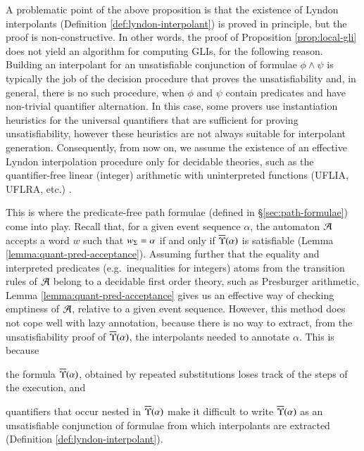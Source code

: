 A problematic point of the above proposition is that the existence of
Lyndon interpolants (Definition \ref{def:lyndon-interpolant}) is
proved in principle, but the proof is non-constructive. In other
words, the proof of Proposition \ref{prop:local-gli} does not yield an
algorithm for computing GLIs, for the following reason. Building an
interpolant for an unsatisfiable conjunction of formulae $\phi \wedge
\psi$ is typically the job of the decision procedure that proves the
unsatisfiability and, in general, there is no such procedure, when
$\phi$ and $\psi$ contain predicates and have non-trivial quantifier
alternation. In this case, some provers use instantiation heuristics
for the universal quantifiers that are sufficient for proving
unsatisfiability, however these heuristics are not always suitable for
interpolant generation. Consequently, from now on, we assume the
existence of an effective Lyndon interpolation procedure only for
decidable theories, such as the quantifier-free linear (integer)
arithmetic with uninterpreted functions (UFLIA, UFLRA, etc.)
\cite{RybalchenkoSofronieStokkermans}.

This is where the predicate-free path formulae (defined in
\S\ref{sec:path-formulae}) come into play. Recall that, for a given
event sequence $\alpha$, the automaton $\mathcal{A}$ accepts a word $w$ such
that ${w}_\Sigma = \alpha$ if and only if $\overline{\Upsilon}({\alpha})$ is
satisfiable (Lemma \ref{lemma:quant-pred-acceptance}). Assuming
further that the equality and interpreted predicates
(e.g.\ inequalities for integers) atoms from the transition rules of
$\mathcal{A}$ belong to a decidable first order theory, such as Presburger
arithmetic, Lemma \ref{lemma:quant-pred-acceptance} gives us an
effective way of checking emptiness of $\mathcal{A}$, relative to a given event
sequence. However, this method does not cope well with lazy
annotation, because there is no way to extract, from the
unsatisfiability proof of $\overline{\Upsilon}({\alpha})$, the interpolants
needed to annotate $\alpha$. This is because \begin{inparaenum}[(i)]
\item\label{it1:gli} the formula $\overline{\Upsilon}({\alpha})$, obtained by
  repeated substitutions loses track of the steps of the execution,
  and
%
\item\label{it2:gli} quantifiers that occur nested in
  $\overline{\Upsilon}({\alpha})$ make it difficult to write $\overline{\Upsilon}({\alpha})$
  as an unsatisfiable conjunction of formulae from which interpolants
  are extracted (Definition \ref{def:lyndon-interpolant}).
\end{inparaenum}


